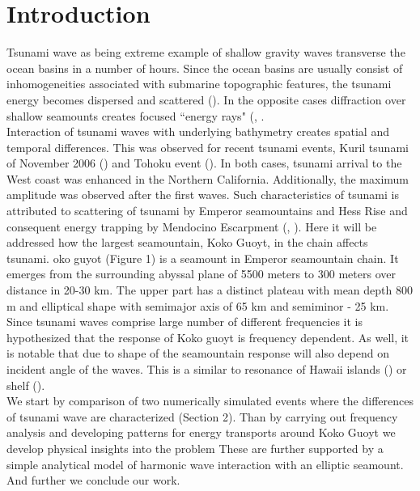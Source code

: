 \section{Introduction}
Tsunami wave as being extreme example of shallow gravity waves transverse the ocean basins in a number of hours. Since the ocean basins are usually consist of inhomogeneities associated with submarine topographic features, the tsunami energy becomes dispersed and scattered (\cite{mofjeld2001tsunami}). In the opposite cases diffraction over shallow seamounts creates focused ``energy rays" (\cite{tang2012direct}, \cite{dushaw2015empirical}.\\
Interaction of tsunami waves with underlying bathymetry creates spatial and temporal differences. This was observed for recent tsunami events, Kuril tsunami of November 2006 (\cite{kowalik2008kuril}) and Tohoku event (\cite{allan2012march}). In both cases, tsunami arrival to the West coast was enhanced in the Northern California. Additionally, the maximum amplitude was observed after the first waves. Such characteristics of tsunami is attributed to scattering of tsunami by Emperor seamountains and Hess Rise and consequent energy trapping by Mendocino Escarpment (\cite{kowalik2008kuril}, \cite{rasmussen2015source}). Here it will be addressed how the largest seamountain, Koko Guoyt, in the chain affects tsunami. oko guyot (Figure 1) is a seamount in Emperor seamountain chain. It emerges from the surrounding abyssal plane of 5500 meters to 300 meters over distance in 20-30 km. The upper part has a distinct plateau with mean depth 800 m and elliptical shape with semimajor axis of 65 km and semiminor - 25 km.\\
Since tsunami waves comprise large number of different frequencies it is hypothesized that the response of Koko guoyt is frequency dependent. As well, it is notable that due to shape of the seamountain response will also depend on incident angle of the waves. This is a similar to resonance of Hawaii islands (\cite{munger2008resonance}) or shelf (\cite{yamazaki2011shelf}).\\
We start by comparison of two numerically simulated events where the differences of tsunami wave are characterized (Section 2). Than by carrying out frequency analysis and developing patterns for energy transports around Koko Guoyt we develop physical insights into the problem These are further supported by a simple analytical model of harmonic wave interaction with an elliptic seamount. And further we conclude our work.


